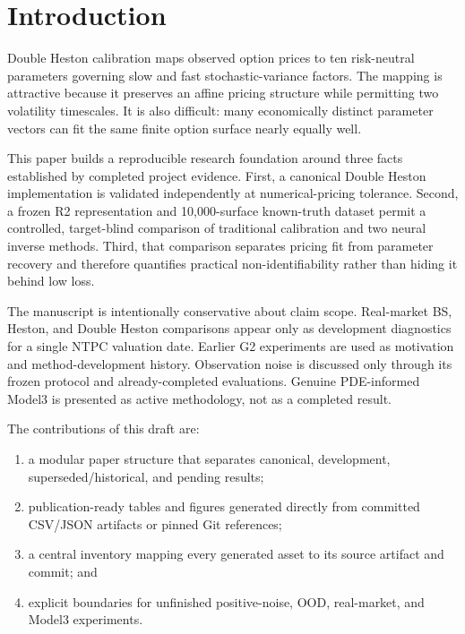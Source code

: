 \section{Introduction}
\label{sec:introduction}

Double Heston calibration maps observed option prices to ten risk-neutral
parameters governing slow and fast stochastic-variance factors. The mapping is
attractive because it preserves an affine pricing structure while permitting two
volatility timescales. It is also difficult: many economically distinct parameter
vectors can fit the same finite option surface nearly equally well.

This paper builds a reproducible research foundation around three facts established
by completed project evidence. First, a canonical Double Heston implementation is
validated independently at numerical-pricing tolerance. Second, a frozen R2
representation and 10{,}000-surface known-truth dataset permit a controlled,
target-blind comparison of traditional calibration and two neural inverse methods.
Third, that comparison separates pricing fit from parameter recovery and therefore
quantifies practical non-identifiability rather than hiding it behind low loss.

The manuscript is intentionally conservative about claim scope. Real-market BS,
Heston, and Double Heston comparisons appear only as development diagnostics for a
single NTPC valuation date. Earlier G2 experiments are used as motivation and
method-development history. Observation noise is discussed only through its frozen
protocol and already-completed evaluations. Genuine PDE-informed Model3 is presented
as active methodology, not as a completed result.

The contributions of this draft are:
\begin{enumerate}
    \item a modular paper structure that separates canonical, development,
          superseded/historical, and pending results;
    \item publication-ready tables and figures generated directly from committed
          CSV/JSON artifacts or pinned Git references;
    \item a central inventory mapping every generated asset to its source artifact
          and commit; and
    \item explicit boundaries for unfinished positive-noise, OOD, real-market, and
          Model3 experiments.
\end{enumerate}
